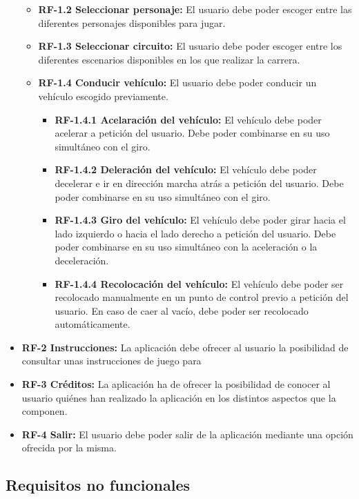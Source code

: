 \begin{itemize}
\begin{itemize}
\begin{itemize}
    	\end{itemize}
    	\item
    		\textbf{RF-1.2 Seleccionar personaje:} El usuario debe poder escoger entre las diferentes personajes disponibles para jugar.
		\item    	
    		\textbf{RF-1.3 Seleccionar circuito:} El usuario debe poder escoger entre los diferentes escenarios disponibles en los que realizar la carrera.
    	\item
    		\textbf{RF-1.4 Conducir vehículo:} El usuario debe poder conducir un vehículo escogido previamente.
    		\begin{itemize}
			\tightlist
				\item \textbf{RF-1.4.1 Acelaración del vehículo:} El vehículo debe poder acelerar a petición del usuario. Debe poder combinarse en su uso simultáneo con el giro.
				\item \textbf{RF-1.4.2 Deleración del vehículo:} El vehículo debe poder decelerar e ir en dirección marcha atrás a petición del usuario. Debe poder combinarse en su uso simultáneo con el giro.
				\item \textbf{RF-1.4.3 Giro del vehículo:} El vehículo debe poder girar hacia el lado izquierdo o hacia el lado derecho a petición del usuario. Debe poder combinarse en su uso simultáneo con la aceleración o la deceleración.
				\item \textbf{RF-1.4.4 Recolocación del vehículo:} El vehículo debe poder ser recolocado manualmente en un punto de control previo a petición del usuario. En caso de caer al vacío, debe poder ser recolocado automáticamente.
			\end{itemize}
    \end{itemize}
    
	\item \textbf{RF-2 Instrucciones:} La aplicación debe ofrecer al usuario la posibilidad de consultar unas instrucciones de juego para 
	\item \textbf{RF-3 Créditos:} La aplicación ha de ofrecer la posibilidad de conocer al usuario quiénes han realizado la aplicación en los distintos aspectos que la componen.
	\item \textbf{RF-4 Salir:} El usuario debe poder salir de la aplicación mediante una opción ofrecida por la misma.
\end{itemize}

\subsection{Requisitos no funcionales}

